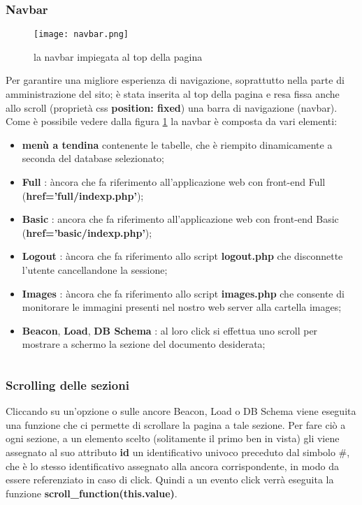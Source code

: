 \subsubsection{Navbar}
\begin{figure}[h]
	\centering
	\caption{la navbar impiegata al top della pagina}
	\label{fig:navbar}
	\texttt{[image: navbar.png]}
\end{figure} 
Per garantire una migliore esperienza di navigazione, soprattutto nella parte di amministrazione del sito; è stata inserita al top della pagina e resa fissa anche allo scroll (proprietà css \textbf{position: fixed}) una barra di navigazione (navbar). 
Come è possibile vedere dalla figura \ref{fig:navbar} la navbar è composta da vari elementi:
\begin{itemize}
\item \textbf{menù a tendina} contenente le tabelle, che è riempito dinamicamente a seconda del database selezionato;
\item \textbf{Full} : àncora che fa riferimento all'applicazione web con front-end Full (\textbf{href='full/indexp.php'});
\item \textbf{Basic} : ancora che fa riferimento all'applicazione web con front-end Basic (\textbf{href='basic/indexp.php'});
\item \textbf{Logout} : àncora che fa riferimento allo script \textbf{logout.php} che disconnette l'utente cancellandone la sessione; 
\item \textbf{Images} : àncora che fa riferimento allo script \textbf{images.php} che consente di monitorare le immagini presenti nel nostro web server alla cartella images;
\item \textbf{Beacon}, \textbf{Load}, \textbf{DB Schema} : al loro click si effettua uno scroll per mostrare a schermo la sezione del documento desiderata;
\begin{lstlisting}[language=PHP]
\end{lstlisting}
\end{itemize}
\subsubsection{Scrolling delle sezioni}
Cliccando su un'opzione o sulle ancore Beacon, Load o DB Schema viene eseguita una funzione che ci permette di scrollare la pagina a tale sezione. \newline
Per fare ciò a ogni sezione, a un elemento scelto (solitamente il primo ben in vista) gli viene assegnato al suo attributo \textbf{id} un identificativo univoco preceduto dal simbolo \#, che è lo stesso identificativo assegnato alla ancora corrispondente, in modo da essere referenziato in caso di click. 
Quindi a un evento click verrà eseguita la funzione \textbf{scroll\_function(this.value)}. \newline

